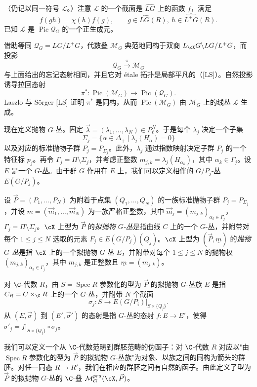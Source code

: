 
（仍记以同一符号 $\mathcal L$。）注意 $\mathcal L$ 的一个截面是 $\widehat{LG}$ 上的函数 $f$，满足
\[
 f(gh)=\chi(h)f(g),\qquad g\in\widehat{LG}(R),\ h\in\widehat{L^+G}(R).
\]
已知 $\mathcal L$ 是 $\operatorname{Pic}\mathcal Q_G$ 的一个正生成元。


借助等同 $\mathcal Q_G=LG/L^+G$，代数叠 $\mathcal M_G$ 典范地同构于双商 $L_\cX G\backslash LG/L^+G$，而投影
\[
 \mathcal Q_G\xrightarrow{\ \pi\ }\mathcal M_G
\]
与上面给出的忘记态射相同，并且它对 étale 拓扑是局部平凡的（[LS]）。自然投影诱导拉回态射
\[
 \pi^*\colon\operatorname{Pic}(\mathcal M_G)\to\operatorname{Pic}(\mathcal Q_G).
\]
Laszlo 与 Sörger [LS] 证明 $\pi^*$ 是同构，从而 $\operatorname{Pic}(\mathcal M_G)$ 由 $\mathcal M_G$ 上的线丛 $\mathcal L$ 生成。


现在定义抛物 $G$-丛。固定 $\vec\lambda=(\lambda_1,\dots,\lambda_N)\in P_\ell^N$。于是每个 $\lambda_j$ 决定一个子集
\[
 \Sigma_j=\{\alpha\in\Delta_+\mid\lambda_j(H_\alpha)=0\}
\]
以及对应的标准抛物子群 $P_j=P_{\Sigma_j}$。此外，$\lambda_j$ 通过指数映射决定子群 $P_j$ 的一个特征标 $p_j$。再令 $\Gamma_j=\Pi\setminus\Sigma_j$，并考虑正整数 $m_{j,k}=\lambda_j(H_{\alpha_k})$，其中 $\alpha_k\in\Gamma_j$。设 $E$ 是一个 $G$-丛。由于群 $G$ 作用在 $E$ 上，我们可以定义相伴的 $G/P_j$-丛 $E(G/P_j)$。



\begin{definition}[5.24]
设 $\vec P=(P_1,\dots,P_N)$ 为附着于点集 $(Q_1,\dots,Q_N)$ 的一族标准抛物子群 $P_j=P_{\Sigma_j}$，并设 $\underline m=(\vec m_1,\dots,\vec m_N)$ 为一族严格正整数，其中 $\vec m_j=(m_{j,k})_{\alpha_k\in\Gamma_j}$，$\Gamma_j=\Pi\setminus\Sigma_j$。$\cX$ 上型为 $\vec P$ 的\emph{拟抛物 $G$-丛}是指曲线 $C$ 上的一个 $G$-丛，并附带对每个 $1\le j\le N$ 选取的元素 $F_j\in E(G/P_j)(Q_j)$。$\cX$ 上型为 $(\vec P,\underline m)$ 的\emph{抛物 $G$-丛}是指 $\cX$ 上的一个拟抛物 $G$-丛 $E$，并附带对每个 $1\le j\le N$ 的抛物权 $(m_{j,k})_{\alpha_k\in\Gamma_j}$，其中 $m_{j,k}$ 是正整数且 $\underline m=(m_{j,k})$。
\end{definition}


对 $\C$-代数 $R$，由 $S=\operatorname{Spec}R$ 参数化的型为 $\vec P$ 的拟抛物 $G$-丛族 $E$ 是指 $C_R=C\times_\C R$ 上的一个 $G$-丛，并附带 $N$ 个截面
\[
 \sigma_j\colon S\to E(G/P_i)|_{S\times\{Q_j\}}.
\]
从 $(E,\vec\sigma)$ 到 $(E',\vec\sigma')$ 的态射是指 $G$-丛的态射 $f\colon E\to E'$，使得 $\sigma'_j=f|_{S\times\{Q_j\}}\circ\sigma_j$。


我们可以定义一个从 $\C$-代数范畴到群胚范畴的伪函子：对 $\C$-代数 $R$ 对应以"由 $\operatorname{Spec}R$ 参数化的型为 $\vec P$ 的拟抛物 $G$-丛族"为对象、以族之间的同构为箭头的群胚。对任一同态 $R\to R'$，我们在相应的群胚之间有自然的函子。由此定义了型为 $\vec P$ 的拟抛物 $G$-丛的 $\C$-叠 $\mathcal M_G^{pra}(\cX,\vec P)$。

